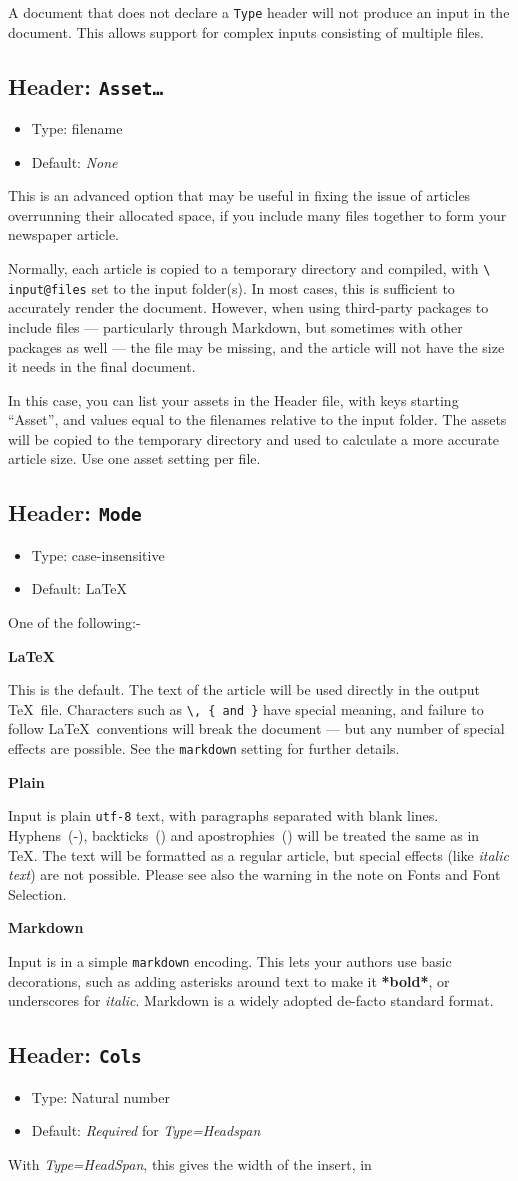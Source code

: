 \documentclass[a4paper,DIV=11]{scrartcl}
\newcommand{\deft}[2]{\nopagebreak\noindent\hspace{0.5in}\textbf{#1}\par\noindent{}#2\pagebreak[1]\par}
\newcommand{\property}[5]{
  \subsection{#1: \texttt{#2}}
  \begin{itemize}
  \item Type: #3
  \item Default: #4
  \end{itemize}
  #5
}
\newcommand{\header}{\property{Header}}
\begin{document}
\begin{multicols}{2}
{  A document that does not declare a \texttt{Type} header will not
  produce an input in the document. This allows support for
  complex inputs consisting of multiple files.
}
\header{Asset\dots}{filename}{\textit{None}}{
  This is an advanced option that may be useful in fixing the issue of
  articles overrunning their allocated space, if you include many
  files together to form your newspaper article.\par
  Normally, each article is copied to a temporary directory and
  compiled, with \texttt{\textbackslash
    input@files} set to the input folder(s). In most cases, this is
  sufficient to accurately render the document. However, when using
  third-party packages to include files --- particularly through
  Markdown, but sometimes with other packages as well --- the file may
  be missing, and the article will not have the size it needs in the
  final document.\par
  In this case, you can list your assets in the Header file, with
  keys starting ``Asset'', and values equal to the filenames relative
  to the input folder. The assets will be copied to the temporary
  directory and used to calculate a more accurate article size. Use
  one asset setting per file.
}
\header{Mode}{case-insensitive}{LaTeX}{
  One of the following:-\par
  \deft{LaTeX}{This is the default. The text of the article will be used
    directly in the output \TeX\ file. Characters such as
    \texttt{\textbackslash, \{ and \}} have special meaning, and failure to
    follow \LaTeX\ conventions will break the document --- but any number
    of special effects are possible. See the \texttt{markdown} setting
    for further details.}
  \deft{Plain}{Input is plain \texttt{utf-8} text, with paragraphs separated
    with blank lines. Hyphens~(-), backticks~(\textasciigrave) and apostrophies~(\textasciiacute) will be
    treated the same as in \TeX. The text will be formatted as a regular article, but
    special effects (like \textit{italic text}) are not
    possible. Please see also the warning in the note on Fonts and
    Font Selection.}
  \deft{Markdown}{Input is in a simple \texttt{markdown} encoding.
    This lets your authors use basic decorations, such as adding
    asterisks around text to make it \textbf{*bold*}, or underscores
    for \textit{\textunderscore italic\textunderscore}. Markdown is a
    widely adopted de-facto standard format.}
}
\header{Cols}{Natural number}{\textit{Required} for \textit{Type=Headspan}}{
  With \textit{Type=HeadSpan}, this gives the width of the insert, in
}
\end{multicols}
\end{document}
